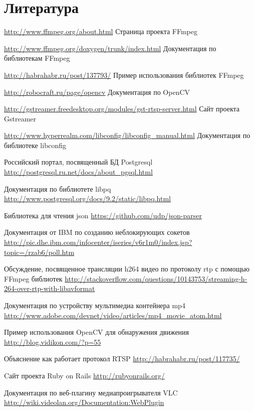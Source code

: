 \chapter*{Литература}
\renewcommand{\bibname}{Список источников}
\begin{thebibliography}{2013}

  \url{http://www.ffmpeg.org/about.html} Страница проекта FFmpeg

  \url{http://www.ffmpeg.org/doxygen/trunk/index.html} Документация по библиотекам FFmpeg

  \url{http://habrahabr.ru/post/137793/} Пример использования библиотек FFmpeg

  \url{http://robocraft.ru/page/opencv} Документация по OpenCV
  
  \url{http://gstreamer.freedesktop.org/modules/gst-rtsp-server.html} Сайт проекта Gstreamer
  
  \url{http://www.hyperrealm.com/libconfig/libconfig_manual.html} Документация по библиотеке libconfig

  Российский портал, посвященный БД Postgresql
  \url{http://postgresql.ru.net/docs/about_pgsql.html}

  Документация по библиотете libpq
  \url{http://www.postgresql.org/docs/9.2/static/libpq.html}

  Библиотека для чтения json
  \url{https://github.com/udp/json-parser}

  Документация от IBM по созданию неблокирующих сокетов
  \url{http://pic.dhe.ibm.com/infocenter/iseries/v6r1m0/index.jsp?topic=/rzab6/poll.htm}

  Обсуждение, посвященное трансляции h264 видео по протоколу rtp с помощью FFmpeg библиотек
  \url{http://stackoverflow.com/questions/10143753/streaming-h-264-over-rtp-with-libavformat}

  Документация по устройству мультимедиа контейнера mp4
  \url{http://www.adobe.com/devnet/video/articles/mp4_movie_atom.html}

  Пример использования OpenCV для обнаружения движения
  \url{http://blog.vidikon.com/?p=55}

  Объяснение как работает протокол RTSP
  \url{http://habrahabr.ru/post/117735/}

  Cайт проекта Ruby on Rails
  \url{http://rubyonrails.org/}

  Документация по веб-плагину медиапроигрывателя VLC
  \url{http://wiki.videolan.org/Documentation:WebPlugin}


\end{thebibliography}

